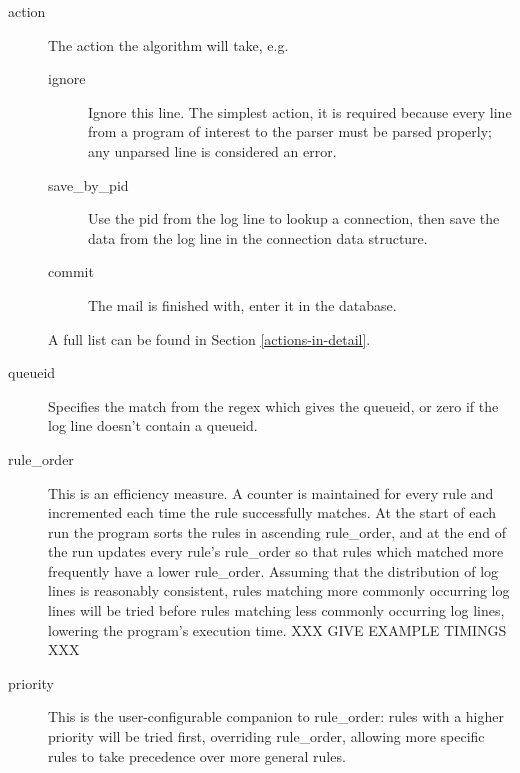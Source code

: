 \documentclass[a4paper,12pt,draft]{article}
\begin{document}
\begin{description}
    \item [action] The action the algorithm will take, e.g.
        \begin{description}
            
            \item [ignore] Ignore this line.  The simplest action, it is
                required because every line from a program of interest to
                the parser must be parsed properly; any unparsed line is
                considered an error.
            
            \item [save\_by\_pid] Use the pid from the log line to lookup a
                connection, then save the data from the log line in the
                connection data structure.

            \item [commit] The mail is finished with, enter it in the
                database.

        \end{description}

        A full list can be found in Section \ref{actions-in-detail}.

    \item [queueid] Specifies the match from the regex which gives the
        queueid, or zero if the log line doesn't contain a queueid.

    \item [rule\_order] This is an efficiency measure.  A counter is
        maintained for every rule and incremented each time the rule
        successfully matches.  At the start of each run the program sorts
        the rules in ascending rule\_order, and at the end of the run
        updates every rule's rule\_order so that rules which matched more
        frequently have a lower rule\_order.  Assuming that the 
        distribution of log lines is reasonably consistent, rules matching
        more commonly occurring log lines will be tried before rules
        matching less commonly occurring log lines, lowering the program's
        execution time.  XXX GIVE EXAMPLE TIMINGS XXX

    \item [priority] This is the user-configurable companion to
        rule\_order: rules with a higher priority will be tried first,
        overriding rule\_order, allowing more specific rules to take
        precedence over more general rules.

\end{description}
\end{document}
